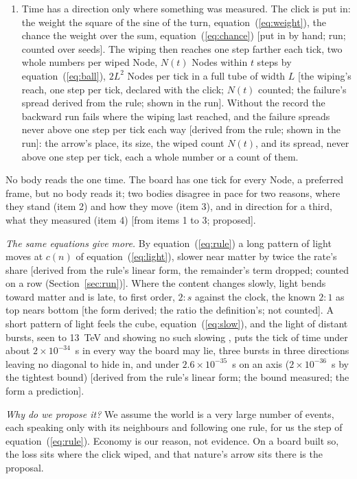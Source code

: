 \documentclass[pdflatex,sn-mathphys-num]{sn-jnl}
\begin{document}
\begin{enumerate}
\item Time has a direction only where something was measured. The click is put in: the weight the square of the sine of the turn, equation~(\ref{eq:weight}), the chance the weight over the sum, equation~(\ref{eq:chance}) [put in by hand; run; counted over seeds]. The wiping then reaches one step farther each tick, two whole numbers per wiped Node, $N(t)$ Nodes within $t$ steps by equation~(\ref{eq:ball}), $2L^2$ Nodes per tick in a full tube of width $L$ [the wiping's reach, one step per tick, declared with the click; $N(t)$ counted; the failure's spread derived from the rule; shown in the run]. Without the record the backward run fails where the wiping last reached, and the failure spreads never above one step per tick each way [derived from the rule; shown in the run]: the arrow's place, its size, the wiped count $N(t)$, and its spread, never above one step per tick, each a whole number or a count of them.
\end{enumerate}
No body reads the one time. The board has one tick for every Node, a preferred frame, but no body reads it; two bodies disagree in pace for two reasons, where they stand (item 2) and how they move (item 3), and in direction for a third, what they measured (item 4) [from items 1 to 3; proposed].

\textit{The same equations give more.} By equation~(\ref{eq:rule}) a long pattern of light moves at $c(n)$ of equation~(\ref{eq:light}), slower near matter by twice the rate's share [derived from the rule's linear form, the remainder's term dropped; counted on a row (Section~\ref{sec:run})]. Where the content changes slowly, light bends toward matter and is late, to first order, $2 : s$ against the clock, the known $2 : 1$ as top nears bottom [the form derived; the ratio the definition's; not counted]. A short pattern of light feels the cube, equation~(\ref{eq:slow}), and the light of distant bursts, seen to 13~TeV \cite{lhaaso2023b} and showing no such slowing \cite{acciari2020,vasileiou2013,lhaaso2024}, puts the tick of time under about $2 \times 10^{-34}$~s in every way the board may lie, three bursts in three directions leaving no diagonal to hide in, and under $2.6 \times 10^{-35}$~s on an axis ($2 \times 10^{-36}$~s by the tightest bound) [derived from the rule's linear form; the bound measured; the form a prediction].

\textit{Why do we propose it?} We assume the world is a very large number of events, each speaking only with its neighbours and following one rule, for us the step of equation~(\ref{eq:rule}). Economy is our reason, not evidence. On a board built so, the loss sits where the click wiped, and that nature's arrow sits there is the proposal.
\end{document}
